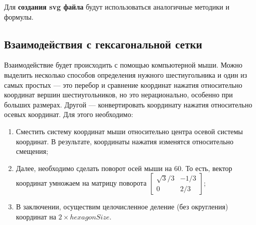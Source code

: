 Для \textbf{создания svg файла} будут использоваться аналогичные методики и формулы.
\subsection{Взаимодействия с гексагональной сетки}

Взаимодействие будет происходить с помощью компьютерной мыши. Можно выделить несколько способов определения нужного шестиугольника и один из самых простых --- это перебор и сравнение координат нажатия относительно координат вершин шестиугольников, но это нерационально, особенно при больших размерах. Другой --- конвертировать координату нажатия относительно осевых координат. Для этого необходимо:
\begin{enumerate}
	\item Сместить систему координат мыши относительно центра осевой системы координат. В результате, координаты нажатия изменятся относительно смещения;
	\item Далее, необходимо сделать поворот осей мыши на 60\degree. То есть, вектор координат умножаем на матрицу поворота $\begin{bmatrix}\sqrt{3}/3& -1/3\\0& 2/3\end{bmatrix}$;
	\item В заключении, осуществим целочисленное деление (без округления) координат на $2\times hexagonSize$. 
\end{enumerate}
